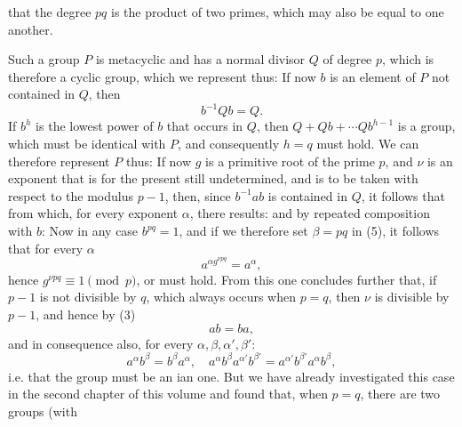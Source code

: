that the degree $pq$ is the product of two primes, which may also be equal to one another.

Such a group $P$ is metacyclic and has a normal divisor $Q$ of degree $p$, which is therefore a cyclic group, which we represent thus:
If now $b$ is an element of $P$ not contained in $Q$, then
\[
b^{-1} Q b = Q.
\]
If $b^h$ is the lowest power of $b$ that occurs in $Q$, then $Q + Qb + \cdots Qb^{h-1}$ is a group, which must be identical with $P$, and consequently $h = q$ must hold. We can therefore represent $P$ thus:
If now $g$ is a primitive root of the prime $p$, and $\nu$ is an exponent that is for the present still undetermined, and is to be taken with respect to the modulus $p - 1$, then, since $b^{-1} a b$ is contained in $Q$, it follows that
from which, for every exponent $\alpha$, there results:
and by repeated composition with $b$:
Now in any case $b^{pq} = 1$, and if we therefore set $\beta = pq$ in (5), it follows that for every $\alpha$
\[
a^{\alpha g^{\nu pq}} = a^\alpha,
\]
hence $g^{\nu pq} \equiv 1 \pmod{p}$, or
must hold. From this one concludes further that, if $p - 1$ is not divisible by $q$, which always occurs when $p = q$, then $\nu$ is divisible by $p - 1$, and hence by (3)
\[
ab = ba,
\]
and in consequence also, for every $\alpha, \beta, \alpha', \beta'$:
\[
a^\alpha b^\beta = b^\beta a^\alpha, \quad a^\alpha b^\beta a^{\alpha'} b^{\beta'} = a^{\alpha'} b^{\beta'} a^\alpha b^\beta,
\]
i.e. that the group must be an ian one. But we have already investigated this case in the second chapter of this volume and found that, when $p = q$, there are two groups (with
